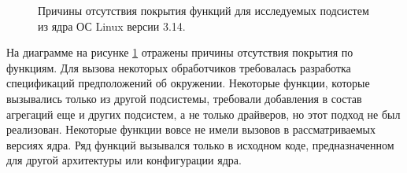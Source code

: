 \begin{figure}
\centering
\caption{Причины отсутствия покрытия функций для исследуемых подсистем из ядра ОС Linux версии 3.14.}
\label{figure:func_no_coverage}
\end{figure}

На диаграмме на рисунке \ref{figure:func_no_coverage} отражены причины отсутствия покрытия по функциям.
Для вызова некоторых обработчиков требовалась разработка спецификаций предположений об окружении.
Некоторые функции, которые вызывались только из другой подсистемы, требовали добавления в состав агрегаций еще и других подсистем, а не только драйверов, но этот подход не был реализован.
Некоторые функции вовсе не имели вызовов в рассматриваемых версиях ядра.
Ряд функций вызывался только в исходном коде, предназначенном для другой архитектуры или конфигурации ядра.

